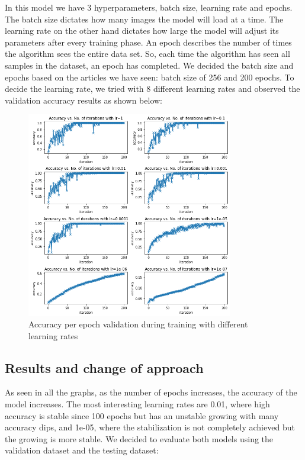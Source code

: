 \documentclass[conference]{IEEEtran}
\begin{document}
In this model we have 3 hyperparameters, batch size, learning rate and epochs. The batch size dictates how many images the model will load at a time. The learning rate on the other hand dictates how large the model will adjust its parameters after every training phase. An epoch describes the number of times the algorithm sees the entire data set. So, each time the algorithm has seen all samples in the dataset, an epoch has completed. We decided the batch size and epochs based on the articles we have seen: batch size of 256 and 200 epochs.\cite{logistic-torch} To decide the learning rate, we tried with 8 different learning rates and observed the validation accuracy results as shown below:

\begin{figure}[htbp]
    \centerline{\includegraphics[width=9cm]{img/logisticRegression.png}}
    \caption{Accuracy per epoch validation during training with different learning rates}
    \label{fig:accuracy_per_epoch}
\end{figure}
\subsection{Results and change of approach}

As seen in all the graphs, as the number of epochs increases, the accuracy of the model increases. The most interesting learning rates are 0.01, where high accuracy is stable since 100 epochs but has an unstable growing with many accuracy dips, and 1e-05, where the stabilization is not completely achieved but the growing is more stable.
We decided to evaluate both models using the validation dataset and the testing dataset:
\end{document}
